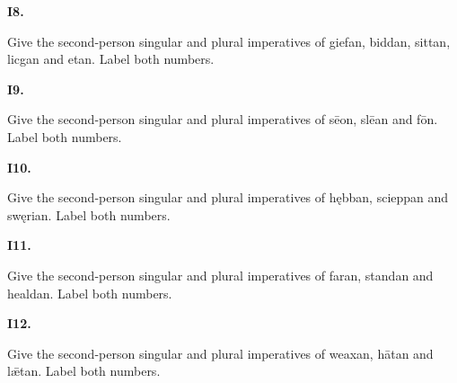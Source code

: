 \par\begin{minipage}{\linewidth}\raggedright
\textbf{I8.}

Give the second-person singular and plural imperatives of giefan, biddan, sittan, licgan and etan. Label both numbers.

\end{minipage}\par\addvspace{4pt}

\par\begin{minipage}{\linewidth}\raggedright
\textbf{I9.}

Give the second-person singular and plural imperatives of sēon, slēan and fōn. Label both numbers.

\end{minipage}\par\addvspace{4pt}

\par\begin{minipage}{\linewidth}\raggedright
\textbf{I10.}

Give the second-person singular and plural imperatives of hębban, scieppan and swęrian. Label both numbers.

\end{minipage}\par\addvspace{4pt}

\par\begin{minipage}{\linewidth}\raggedright
\textbf{I11.}

Give the second-person singular and plural imperatives of faran, standan and healdan. Label both numbers.

\end{minipage}\par\addvspace{4pt}

\par\begin{minipage}{\linewidth}\raggedright
\textbf{I12.}

Give the second-person singular and plural imperatives of weaxan, hātan and lǣtan. Label both numbers.

\end{minipage}\par\addvspace{4pt}

